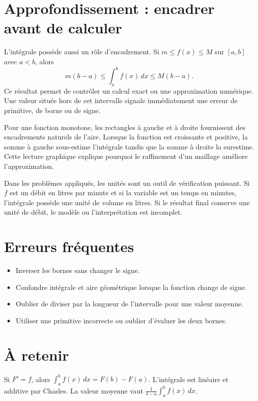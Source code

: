 \section{Approfondissement : encadrer avant de calculer}
L’intégrale possède aussi un rôle d’encadrement. Si $m\leq f(x)\leq M$ sur $[a,b]$ avec $a<b$, alors
\[
m(b-a)\leq\int_a^b f(x)\,dx\leq M(b-a).
\]
Ce résultat permet de contrôler un calcul exact ou une approximation numérique. Une valeur située hors de cet intervalle signale immédiatement une erreur de primitive, de borne ou de signe.

Pour une fonction monotone, les rectangles à gauche et à droite fournissent des encadrements naturels de l’aire. Lorsque la fonction est croissante et positive, la somme à gauche sous-estime l’intégrale tandis que la somme à droite la surestime. Cette lecture graphique explique pourquoi le raffinement d’un maillage améliore l’approximation.

Dans les problèmes appliqués, les unités sont un outil de vérification puissant. Si $f$ est un débit en litres par minute et si la variable est un temps en minutes, l’intégrale possède une unité de volume en litres. Si le résultat final conserve une unité de débit, le modèle ou l’interprétation est incomplet.

\section{Erreurs fréquentes}
\begin{itemize}
\item Inverser les bornes sans changer le signe.
\item Confondre intégrale et aire géométrique lorsque la fonction change de signe.
\item Oublier de diviser par la longueur de l’intervalle pour une valeur moyenne.
\item Utiliser une primitive incorrecte ou oublier d’évaluer les deux bornes.
\end{itemize}

\section{À retenir}
\begin{aretenir}
Si $F'=f$, alors $\int_a^b f(x)\,dx=F(b)-F(a)$. L’intégrale est linéaire et additive par Chasles. La valeur moyenne vaut $\frac1{b-a}\int_a^b f(x)\,dx$.
\end{aretenir}
